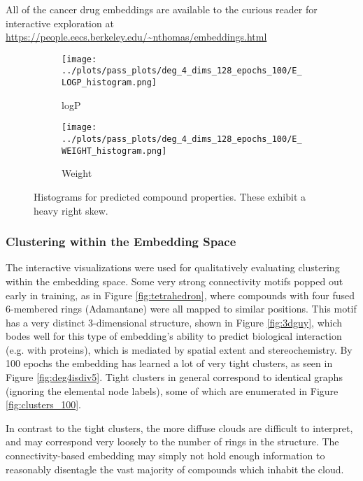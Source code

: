 All of the cancer drug embeddings are available to the curious reader for interactive exploration at \url{https://people.eecs.berkeley.edu/~nthomas/embeddings.html}

\begin{figure}
\centering
\begin{subfigure}{0.45\linewidth}
    \texttt{[image: ../plots/pass\_plots/deg\_4\_dims\_128\_epochs\_100/E\_LOGP\_histogram.png]}
    \caption{logP}
\end{subfigure}
\begin{subfigure}{0.45\linewidth}
    \texttt{[image: ../plots/pass\_plots/deg\_4\_dims\_128\_epochs\_100/E\_WEIGHT\_histogram.png]}
    \caption{Weight}
\end{subfigure}
\caption{Histograms for predicted compound properties. These exhibit a heavy right skew.}
\label{fig:histograms}
\end{figure}



\subsubsection{Clustering within the Embedding Space}

The interactive visualizations were used for qualitatively evaluating clustering within the embedding space. Some very strong connectivity motifs popped out early in training, as in Figure \ref{fig:tetrahedron}, where compounds with four fused 6-membered rings (Adamantane) were all mapped to similar positions. This motif has a very distinct 3-dimensional structure, shown in Figure \ref{fig:3dguy}, which bodes well for this type of embedding's ability to predict biological interaction (e.g. with proteins), which is mediated by spatial extent and stereochemistry. By 100 epochs the embedding has learned a lot of very tight clusters, as seen in Figure \ref{fig:deg4isdiv5}. Tight clusters in general correspond to identical graphs (ignoring the elemental node labels), some of which are enumerated in Figure \ref{fig:clusters_100}.

In contrast to the tight clusters, the more diffuse clouds are difficult to interpret, and may correspond very loosely to the number of rings in the structure. The connectivity-based embedding may simply not hold enough information to reasonably disentagle the vast majority of compounds which inhabit the cloud.


